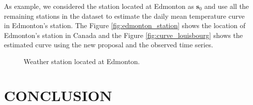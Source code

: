 \documentclass[
  12pt,
]{article}
\theoremstyle{definition}
\theoremstyle{definition}
\theoremstyle{definition}
\theoremstyle{remark}
\begin{document}
As example, we considered the station located at Edmonton as \(\bm{s}_0\) and use all the remaining stations in the dataset to estimate the daily mean temperature curve in Edmonton's station. The Figure \ref{fig:edmonton_station} shows the location of Edmonton's station in Canada and the Figure \ref{fig:curve_louisbourg} shows the estimated curve using the new proposal and the observed time series.

\begin{figure}[htbp]
  \hfill
    \caption{Weather station located at Edmonton.}
\end{figure}

\hypertarget{sec:conclusion}{%
\section{CONCLUSION}\label{sec:conclusion}}
\end{document}
